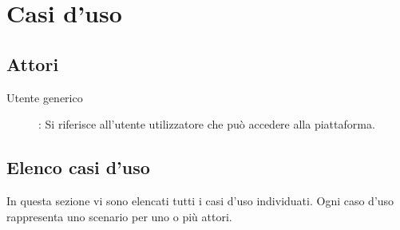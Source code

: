 \section{Casi d'uso}

\subsection{Attori}

\begin{description}
\item[Utente generico]:
Si riferisce all'utente utilizzatore che può accedere alla piattaforma.
\end{description}
\subsection{Elenco casi d'uso}
In questa sezione vi sono elencati tutti i casi d'uso individuati. Ogni caso d'uso rappresenta uno scenario per uno o più attori.